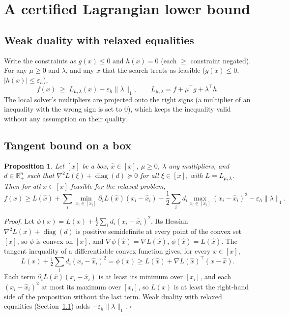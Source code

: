 \documentclass[11pt]{article}
\newtheorem{proposition}{Proposition}
\begin{document}
\section{A certified Lagrangian lower bound}\label{sec:bound}

\subsection{Weak duality with relaxed equalities}\label{sec:weak}

Write the constraints as $g(x) \le 0$ and $h(x) = 0$ (each $\ge$ constraint negated).
For any $\mu \ge 0$ and $\lambda$, and any $x$ that the search treats as feasible
($g(x) \le 0$, $|h(x)| \le \varepsilon_h$),
\[
  f(x) \;\ge\; L_{\mu,\lambda}(x) - \varepsilon_h \|\lambda\|_1,
  \qquad L_{\mu,\lambda} = f + \mu^\top g + \lambda^\top h .
\]
The local solver's multipliers are projected onto the right signs (a multiplier of an
inequality with the wrong sign is set to $0$), which keeps the inequality valid without
any assumption on their quality.

\subsection{Tangent bound on a box}

\begin{proposition}\label{prop:bound}
Let $[x]$ be a box, $\hat x \in [x]$, $\mu \ge 0$, $\lambda$ any multipliers, and
$d \in \mathbb{R}^n_+$ such that $\nabla^2 L(\xi) + \operatorname{diag}(d) \succeq 0$
for all $\xi \in [x]$, with $L = L_{\mu,\lambda}$.
Then for all $x \in [x]$ feasible for the relaxed problem,
\[
  f(x) \ge L(\hat x) + \sum_i \min_{x_i \in [x_i]} \partial_i L(\hat x)(x_i - \hat x_i)
  - \frac12 \sum_i d_i \max_{x_i \in [x_i]} (x_i - \hat x_i)^2
  - \varepsilon_h \|\lambda\|_1 .
\]
\end{proposition}
\emph{Proof.} Let $\phi(x) = L(x) + \frac12 \sum_i d_i (x_i - \hat x_i)^2$. Its Hessian
$\nabla^2 L(x) + \operatorname{diag}(d)$ is positive semidefinite at every point of the
convex set $[x]$, so $\phi$ is convex on $[x]$, and
$\nabla\phi(\hat x) = \nabla L(\hat x)$, $\phi(\hat x) = L(\hat x)$. The tangent
inequality of a differentiable convex function gives, for every $x \in [x]$,
\[
  L(x) + \tfrac12 \textstyle\sum_i d_i (x_i - \hat x_i)^2 = \phi(x) \ge
  L(\hat x) + \nabla L(\hat x)^\top (x - \hat x).
\]
Each term $\partial_i L(\hat x)(x_i - \hat x_i)$ is at least its minimum over $[x_i]$,
and each $(x_i - \hat x_i)^2$ at most its maximum over $[x_i]$, so $L(x)$ is at least
the right-hand side of the proposition without the last term. Weak duality with
relaxed equalities (Section~\ref{sec:weak}) adds $-\varepsilon_h\|\lambda\|_1$. $\square$
\end{document}
